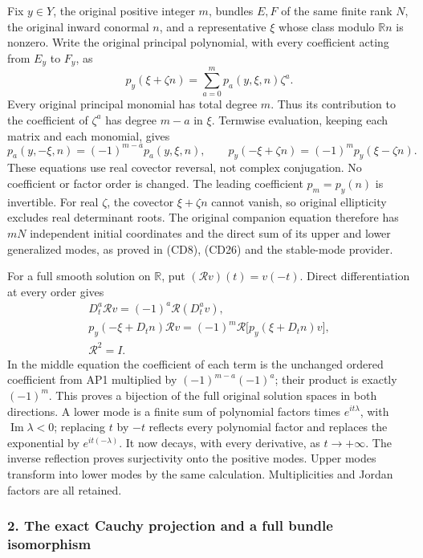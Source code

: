 \documentclass[
  11pt,
]{article}
\begin{document}
Fix \(y\in Y\), the original positive integer \(m\), bundles \(E,F\) of
the same finite rank \(N\), the original inward conormal \(n\), and a
representative \(\xi\) whose class modulo \(\mathbb R n\) is nonzero.
Write the original principal polynomial, with every coefficient acting
from \(E_y\) to \(F_y\), as \[
 p_y(\xi+\zeta n)=\sum_{a=0}^{m}p_a(y,\xi,n)\zeta^a.
 \tag{AP1}
\] Every original principal monomial has total degree \(m\). Thus its
contribution to the coefficient of \(\zeta^a\) has degree \(m-a\) in
\(\xi\). Termwise evaluation, keeping each matrix and each monomial,
gives \[
 p_a(y,-\xi,n)=(-1)^{m-a}p_a(y,\xi,n),\qquad
 p_y(-\xi+\zeta n)=(-1)^m p_y(\xi-\zeta n).
 \tag{AP2}
\] These equations use real covector reversal, not complex conjugation.
No coefficient or factor order is changed. The leading coefficient
\(p_m=p_y(n)\) is invertible. For real \(\zeta\), the covector
\(\xi+\zeta n\) cannot vanish, so original ellipticity excludes real
determinant roots. The original companion equation therefore has \(mN\)
independent initial coordinates and the direct sum of its upper and
lower generalized modes, as proved in (CD8), (CD26) and the stable-mode
provider.

For a full smooth solution on \(\mathbb R\), put
\((\mathscr Rv)(t)=v(-t)\). Direct differentiation at every order gives
\[
 \begin{gathered}
 D_t^a\mathscr Rv=(-1)^a\mathscr R(D_t^av),\\
 p_y(-\xi+D_tn)\mathscr Rv
   =(-1)^m\mathscr R\big[p_y(\xi+D_tn)v\big],\\
 \mathscr R^2=I.
 \end{gathered}
 \tag{AP3}
\] In the middle equation the coefficient of each term is the unchanged
ordered coefficient from AP1 multiplied by \((-1)^{m-a}(-1)^a\); their
product is exactly \((-1)^m\). This proves a bijection of the full
original solution spaces in both directions. A lower mode is a finite
sum of polynomial factors times \(e^{it\lambda}\), with
\(\operatorname{Im}\lambda<0\); replacing \(t\) by \(-t\) reflects every
polynomial factor and replaces the exponential by \(e^{it(-\lambda)}\).
It now decays, with every derivative, as \(t\to+\infty\). The inverse
reflection proves surjectivity onto the positive modes. Upper modes
transform into lower modes by the same calculation. Multiplicities and
Jordan factors are all retained.

\subsubsection{2. The exact Cauchy projection and a full bundle
isomorphism}\label{the-exact-cauchy-projection-and-a-full-bundle-isomorphism}
\end{document}
